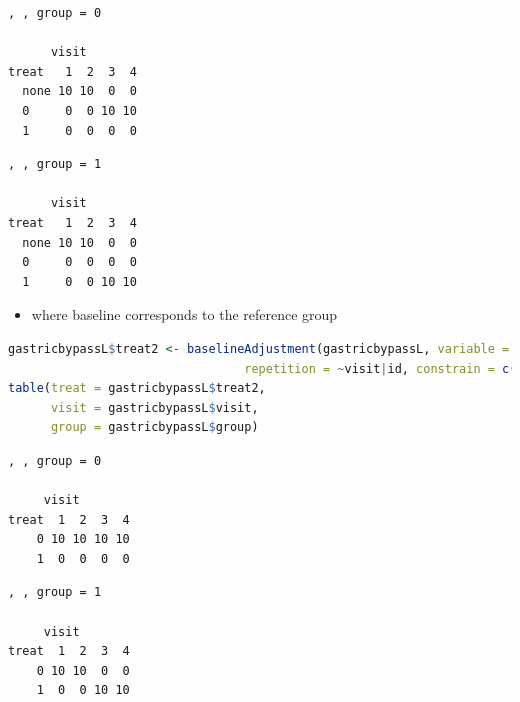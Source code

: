 \documentclass[12pt]{article}
\begin{document}
\begin{minipage}{0.45\linewidth}
\label{}
\begin{verbatim}
, , group = 0

      visit
treat   1  2  3  4
  none 10 10  0  0
  0     0  0 10 10
  1     0  0  0  0
\end{verbatim}

\end{minipage}
\begin{minipage}{0.05\linewidth}
\hphantom{x}
\end{minipage}
\begin{minipage}{0.45\linewidth}
\label{}
\begin{verbatim}
, , group = 1

      visit
treat   1  2  3  4
  none 10 10  0  0
  0     0  0  0  0
  1     0  0 10 10
\end{verbatim}


\end{minipage}


\begin{itemize}
\item where baseline corresponds to the reference group
\end{itemize}
\begin{lstlisting}[language=r,numbers=none]
gastricbypassL$treat2 <- baselineAdjustment(gastricbypassL, variable = "group",
                                 repetition = ~visit|id, constrain = c("1","2"))
table(treat = gastricbypassL$treat2,
      visit = gastricbypassL$visit,
      group = gastricbypassL$group)
\end{lstlisting}

\begin{minipage}{0.45\linewidth}
\label{}
\begin{verbatim}
, , group = 0

     visit
treat  1  2  3  4
    0 10 10 10 10
    1  0  0  0  0
\end{verbatim}

\end{minipage}
\begin{minipage}{0.05\linewidth}
\hphantom{x}
\end{minipage}
\begin{minipage}{0.45\linewidth}
\label{}
\begin{verbatim}
, , group = 1

     visit
treat  1  2  3  4
    0 10 10  0  0
    1  0  0 10 10
\end{verbatim}


\end{minipage}
\end{document}
